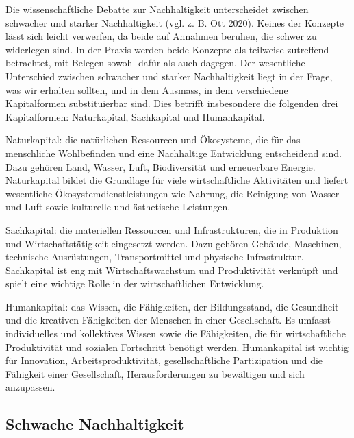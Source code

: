 \documentclass[
  nswissgerman,
  a4paper,
  openany]{book}
\begin{document}
Die wissenschaftliche Debatte zur Nachhaltigkeit unterscheidet zwischen
schwacher und starker Nachhaltigkeit (vgl. z. B. Ott 2020). Keines der
Konzepte lässt sich leicht verwerfen, da beide auf Annahmen beruhen, die
schwer zu widerlegen sind. In der Praxis werden beide Konzepte als
teilweise zutreffend betrachtet, mit Belegen sowohl dafür als auch
dagegen. Der wesentliche Unterschied zwischen schwacher und starker
Nachhaltigkeit liegt in der Frage, was wir erhalten sollten, und in dem
Ausmass, in dem verschiedene Kapitalformen substituierbar sind. Dies
betrifft insbesondere die folgenden drei Kapitalformen: Naturkapital,
Sachkapital und Humankapital.

Naturkapital: die natürlichen Ressourcen und Ökosysteme, die für das
menschliche Wohlbefinden und eine Nachhaltige Entwicklung entscheidend
sind. Dazu gehören Land, Wasser, Luft, Biodiversität und erneuerbare
Energie. Naturkapital bildet die Grundlage für viele wirtschaftliche
Aktivitäten und liefert wesentliche Ökosystemdienstleistungen wie
Nahrung, die Reinigung von Wasser und Luft sowie kulturelle und
ästhetische Leistungen.

Sachkapital: die materiellen Ressourcen und Infrastrukturen, die in
Produktion und Wirtschaftstätigkeit eingesetzt werden. Dazu gehören
Gebäude, Maschinen, technische Ausrüstungen, Transportmittel und
physische Infrastruktur. Sachkapital ist eng mit Wirtschaftswachstum und
Produktivität verknüpft und spielt eine wichtige Rolle in der
wirtschaftlichen Entwicklung.

Humankapital: das Wissen, die Fähigkeiten, der Bildungsstand, die
Gesundheit und die kreativen Fähigkeiten der Menschen in einer
Gesellschaft. Es umfasst individuelles und kollektives Wissen sowie die
Fähigkeiten, die für wirtschaftliche Produktivität und sozialen
Fortschritt benötigt werden. Humankapital ist wichtig für Innovation,
Arbeitsproduktivität, gesellschaftliche Partizipation und die Fähigkeit
einer Gesellschaft, Herausforderungen zu bewältigen und sich anzupassen.

\subsection{Schwache Nachhaltigkeit}\label{schwache-nachhaltigkeit}
\end{document}
